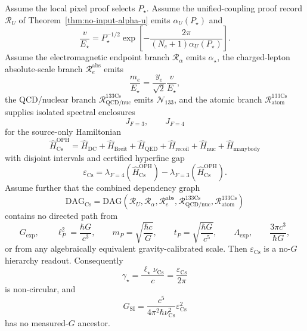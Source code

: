 \begin{theorem}\label{thm:no-g-clock-hierarchy}
Assume the local pixel proof selects \(P_\star\). Assume the unified-coupling proof record
\(\mathcal R_U\) of Theorem~\ref{thm:no-input-alpha-u} emits \(\alpha_U(P_\star)\) and
\[
\frac{v}{E_\star}
=
P_\star^{-1/2}
\exp\!\left[
-\frac{2\pi}{(N_c+1)\alpha_U(P_\star)}
\right].
\]
Assume the electromagnetic endpoint branch \(\mathcal R_\alpha\) emits \(\alpha_\star\), the
charged-lepton absolute-scale branch \(\mathcal R_e^{\mathrm{abs}}\) emits
\[
\frac{m_e}{E_\star}
=
\frac{y_e}{\sqrt2}\frac{v}{E_\star},
\]
the QCD/nuclear branch \(\mathcal R_{\mathrm{QCD/nuc}}^{133\mathrm{Cs}}\) emits
\(\mathcal N_{133}\), and the atomic branch
\(\mathcal R_{\mathrm{atom}}^{133\mathrm{Cs}}\) supplies isolated spectral enclosures
\[
J_{F=3},\qquad J_{F=4}
\]
for the source-only Hamiltonian
\[
\widehat H_{\mathrm{Cs}}^{\mathrm{OPH}}
=
\widehat H_{\mathrm{DC}}
+
\widehat H_{\mathrm{Breit}}
+
\widehat H_{\mathrm{QED}}
+
\widehat H_{\mathrm{recoil}}
+
\widehat H_{\mathrm{nuc}}
+
\widehat H_{\mathrm{manybody}}
\]
with disjoint intervals and certified hyperfine gap
\[
\varepsilon_{\mathrm{Cs}}
=
\lambda_{F=4}(\widehat H_{\mathrm{Cs}}^{\mathrm{OPH}})
-
\lambda_{F=3}(\widehat H_{\mathrm{Cs}}^{\mathrm{OPH}}).
\]
Assume further that the combined dependency graph
\[
\mathrm{DAG}_{\mathrm{Cs}}
=
\mathrm{DAG}
\left(
\mathcal R_U,
\mathcal R_\alpha,
\mathcal R_e^{\mathrm{abs}},
\mathcal R_{\mathrm{QCD/nuc}}^{133\mathrm{Cs}},
\mathcal R_{\mathrm{atom}}^{133\mathrm{Cs}}
\right)
\]
contains no directed path from
\[
G_{\mathrm{exp}},
\qquad
\ell_P^2=\frac{\hbar G}{c^3},
\qquad
m_P=\sqrt{\frac{\hbar c}{G}},
\qquad
t_P=\sqrt{\frac{\hbar G}{c^5}},
\qquad
\Lambda_{\mathrm{exp}},
\qquad
\frac{3\pi c^3}{\hbar G},
\]
or from any algebraically equivalent gravity-calibrated scale. Then
\(\varepsilon_{\mathrm{Cs}}\) is a no-\(G\) hierarchy readout. Consequently
\[
\gamma_\star
=
\frac{\ell_\star\nu_{\mathrm{Cs}}}{c}
=
\frac{\varepsilon_{\mathrm{Cs}}}{2\pi}
\]
is non-circular, and
\[
G_{\mathrm{SI}}
=
\frac{c^5}{4\pi^2\hbar\nu_{\mathrm{Cs}}^2}
\varepsilon_{\mathrm{Cs}}^2
\]
has no measured-\(G\) ancestor.
\end{theorem}

